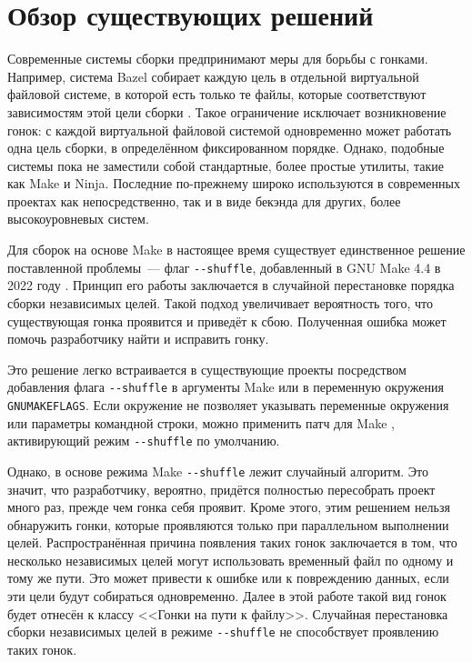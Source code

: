 \section{Обзор существующих решений}
\label{sec:Chapter2} 


Современные системы сборки предпринимают меры для борьбы с гонками. Например, система Bazel собирает каждую цель в отдельной виртуальной файловой системе, в которой есть только те файлы, которые соответствуют зависимостям этой цели сборки \cite{bazel-sandbox}. Такое ограничение исключает возникновение гонок: с каждой виртуальной файловой системой одновременно может работать одна цель сборки, в определённом фиксированном порядке. Однако, подобные системы пока не заместили собой стандартные, более простые утилиты, такие как Make и Ninja. Последние по-прежнему широко используются в современных проектах как непосредственно, так и в виде бекэнда для других, более высокоуровневых систем.

Для сборок на основе Make в настоящее время существует единственное решение поставленной проблемы~--- флаг \texttt{-{}-shuffle}, добавленный в GNU Make 4.4 в 2022 году \cite{trofi-make-shuffle}. Принцип его работы заключается в случайной перестановке порядка сборки независимых целей. Такой подход увеличивает вероятность того, что существующая гонка проявится и приведёт к сбою. Полученная ошибка может помочь разработчику найти и исправить гонку.

Это решение легко встраивается в существующие проекты посредством добавления флага \texttt{-{}-shuffle} в аргументы Make или в переменную окружения \texttt{GNUMAKEFLAGS}. Если окружение не позволяет указывать переменные окружения или параметры командной строки, можно применить патч для Make \cite{make-shuffle-patch}, активирующий режим \texttt{-{}-shuffle} по умолчанию.

Однако, в основе режима Make \texttt{-{}-shuffle} лежит случайный алгоритм. Это значит, что разработчику, вероятно, придётся полностью пересобрать проект много раз, прежде чем гонка себя проявит. Кроме этого, этим решением нельзя обнаружить гонки, которые проявляются только при параллельном выполнении целей. Распространённая причина появления таких гонок заключается в том, что несколько независимых целей могут использовать временный файл по одному и тому же пути. Это может привести к ошибке или к повреждению данных, если эти цели будут собираться одновременно. Далее в этой работе такой вид гонок будет отнесён к классу <<Гонки на пути к файлу>>. Случайная перестановка сборки независимых целей в режиме \texttt{-{}-shuffle} не способствует проявлению таких гонок.